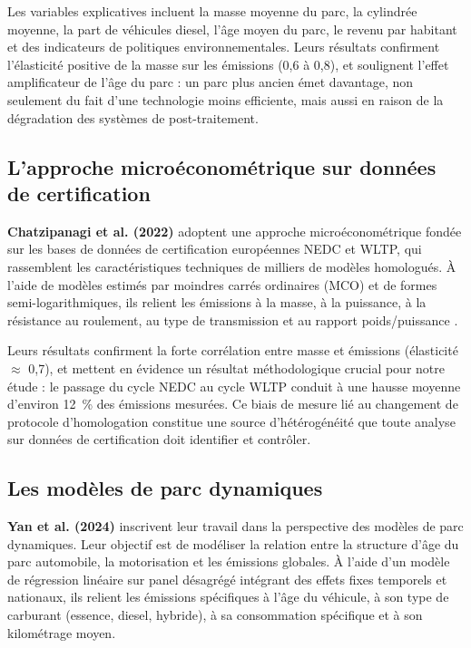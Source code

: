 \documentclass[12pt, a4paper]{article}
\begin{document}
Les variables explicatives incluent la masse moyenne du parc, la cylindrée moyenne, la part de véhicules diesel, l'âge moyen du parc, le revenu par habitant et des indicateurs de politiques environnementales. Leurs résultats confirment l'élasticité positive de la masse sur les émissions (0,6 à 0,8), et soulignent l'effet amplificateur de l'âge du parc : un parc plus ancien émet davantage, non seulement du fait d'une technologie moins efficiente, mais aussi en raison de la dégradation des systèmes de post-traitement.

\subsection{L'approche microéconométrique sur données de certification}

\textbf{Chatzipanagi et al. (2022)} adoptent une approche microéconométrique fondée sur les bases de données de certification européennes NEDC et WLTP, qui rassemblent les caractéristiques techniques de milliers de modèles homologués. À l'aide de modèles estimés par moindres carrés ordinaires (MCO) et de formes semi-logarithmiques, ils relient les émissions à la masse, à la puissance, à la résistance au roulement, au type de transmission et au rapport poids/puissance \cite{chatzipanagi2022}.

Leurs résultats confirment la forte corrélation entre masse et émissions (élasticité $\approx$ 0,7), et mettent en évidence un résultat méthodologique crucial pour notre étude : le passage du cycle NEDC au cycle WLTP conduit à une hausse moyenne d'environ \SI{12}{\percent} des émissions mesurées. Ce biais de mesure lié au changement de protocole d'homologation constitue une source d'hétérogénéité que toute analyse sur données de certification doit identifier et contrôler.

\subsection{Les modèles de parc dynamiques}

\textbf{Yan et al. (2024)} inscrivent leur travail dans la perspective des modèles de parc dynamiques. Leur objectif est de modéliser la relation entre la structure d'âge du parc automobile, la motorisation et les émissions globales. À l'aide d'un modèle de régression linéaire sur panel désagrégé intégrant des effets fixes temporels et nationaux, ils relient les émissions spécifiques à l'âge du véhicule, à son type de carburant (essence, diesel, hybride), à sa consommation spécifique et à son kilométrage moyen.
\end{document}
